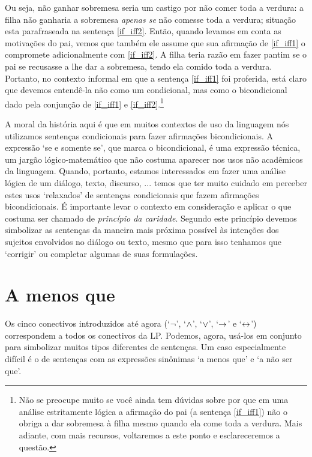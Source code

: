 Ou seja, não ganhar sobremesa seria um castigo por não comer toda a verdura:
a filha não ganharia a sobremesa \emph{apenas se} não comesse toda a verdura; situação esta parafraseada na sentença \ref{if_iff2}.
Então, quando levamos em conta as motivações do pai, vemos que também ele assume que sua afirmação de \ref{if_iff1} o compromete adicionalmente com \ref{if_iff2}.
A filha teria razão em fazer pantim se o pai se recusasse a lhe dar a sobremesa, tendo ela comido toda a verdura.
Portanto, no contexto informal em que a sentença \ref{if_iff1} foi proferida, está claro que devemos entendê-la não como um condicional, mas como o bicondicional dado pela conjunção de \ref{if_iff1} e \ref{if_iff2}.\footnote{
	Não se preocupe muito se você ainda tem dúvidas sobre por que em uma análise estritamente lógica a afirmação do pai (a sentença \ref{if_iff1}) não o obriga a dar sobremesa à filha mesmo quando ela come toda a verdura.
	Mais adiante, com mais recursos, voltaremos a este ponto e esclareceremos a questão.}

A moral da história aqui é que em muitos contextos de uso da linguagem nós utilizamos sentenças condicionais para fazer afirmações bicondicionais.
A expressão `se e somente se', que marca o bicondicional, é uma expressão técnica, um jargão lógico-matemático que não costuma aparecer nos usos não acadêmicos da linguagem.
Quando, portanto, estamos interessados em fazer uma análise lógica de um diálogo, texto, discurso, ... temos que ter muito cuidado em perceber estes usos `relaxados' de sentenças condicionais que fazem afirmações bicondicionais.
É importante levar o contexto em consideração e aplicar o que costuma ser chamado de  \emph{princípio da caridade}.
Segundo este princípio devemos simbolizar as sentenças da maneira mais próxima possível às intenções dos sujeitos envolvidos no diálogo ou texto, mesmo que para isso tenhamos que `corrigir' ou completar algumas de suas formulações.


\section{A menos que}
Os cinco conectivos introduzidos até agora (`$\neg$', `$\wedge$', `$\vee$', `$\rightarrow$' e `$\leftrightarrow$') correspondem a todos os conectivos da LP.
Podemos, agora, usá-los em conjunto para simbolizar muitos tipos diferentes de sentenças.
Um caso especialmente difícil é o de sentenças com as expressões sinônimas  `a menos que' e `a não ser que'.

